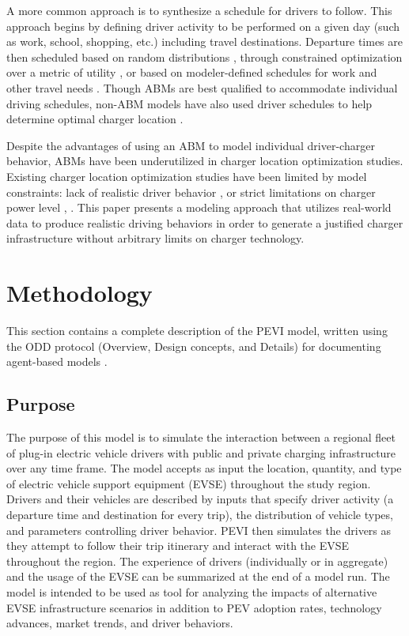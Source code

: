 \documentclass[journal]{IEEEtran}
\begin{document}
A more common approach is to synthesize a schedule for drivers to follow. This approach begins by defining driver activity to be performed on a given day (such as work, school, shopping, etc.) including travel destinations.  Departure times are then scheduled based on random distributions \cite{acha_modelling_2012}, through constrained optimization over a metric of utility \cite{waraich_plug-hybrid_2013}, or based on modeler-defined schedules for work and other travel needs \cite{sweda_agent-based_2012}. Though ABMs are best qualified to accommodate individual driving schedules, non-ABM models have also used driver schedules to help determine optimal charger location \cite{xi_simulation-optimization_2013}. 

Despite the advantages of using an ABM to model individual driver-charger behavior, ABMs have been underutilized in charger location optimization studies. Existing charger location optimization studies have been limited by model constraints: lack of realistic driver behavior \cite{feng_electric_2012}, or strict limitations on charger power level \cite{dong_framework_2013}, \cite{xi_simulation-optimization_2013}. This paper presents a modeling approach that utilizes real-world data to produce realistic driving behaviors in order to generate a justified charger infrastructure without arbitrary limits on charger technology.

\section{Methodology}

This section contains a complete description of the PEVI model, written using the ODD protocol (Overview, Design concepts, and Details) for documenting agent-based models \cite{grimm_standard_2006} \cite{grimm_odd_2010}.

\subsection{Purpose}
The purpose of this model is to simulate the interaction between a regional fleet of plug-in electric vehicle drivers with public and private charging infrastructure over any time frame.  The model accepts as input the location, quantity, and type of electric vehicle support equipment (EVSE) throughout the study region.  Drivers and their vehicles are described by inputs that specify driver activity (a departure time and destination for every trip), the distribution of vehicle types, and parameters controlling driver behavior.  PEVI then simulates the drivers as they attempt to follow their trip itinerary and interact with the EVSE throughout the region.  The experience of drivers (individually or in aggregate) and the usage of the EVSE can be summarized at the end of a model run.  The model is intended to be used as tool for analyzing the impacts of alternative EVSE infrastructure scenarios in addition to PEV adoption rates, technology advances, market trends, and driver behaviors.
\end{document}
